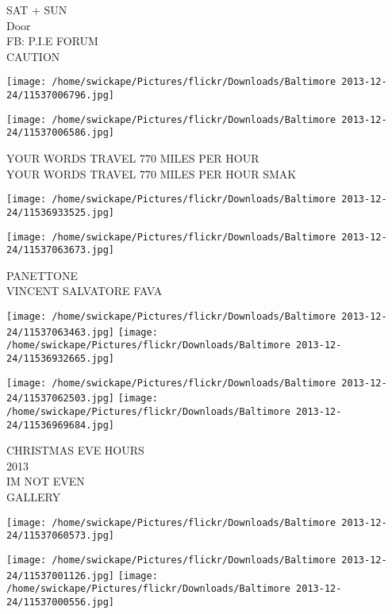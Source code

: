 \documentclass[10pt,letterpaper]{article}
\begin{document}
SAT + SUN\\
Door\\
FB: P.I.E FORUM\\
CAUTION\\
\pagebreak

\texttt{[image: /home/swickape/Pictures/flickr/Downloads/Baltimore 2013-12-24/11537006796.jpg]}

\vspace{0.25in}
\texttt{[image: /home/swickape/Pictures/flickr/Downloads/Baltimore 2013-12-24/11537006586.jpg]}

YOUR WORDS TRAVEL 770 MILES PER HOUR\\
YOUR WORDS TRAVEL 770 MILES PER HOUR SMAK\\
\pagebreak

\texttt{[image: /home/swickape/Pictures/flickr/Downloads/Baltimore 2013-12-24/11536933525.jpg]}

\vspace{0.25in}
\texttt{[image: /home/swickape/Pictures/flickr/Downloads/Baltimore 2013-12-24/11537063673.jpg]}

PANETTONE\\
VINCENT SALVATORE FAVA\\
\pagebreak

\texttt{[image: /home/swickape/Pictures/flickr/Downloads/Baltimore 2013-12-24/11537063463.jpg]}
\texttt{[image: /home/swickape/Pictures/flickr/Downloads/Baltimore 2013-12-24/11536932665.jpg]}

\texttt{[image: /home/swickape/Pictures/flickr/Downloads/Baltimore 2013-12-24/11537062503.jpg]}
\texttt{[image: /home/swickape/Pictures/flickr/Downloads/Baltimore 2013-12-24/11536969684.jpg]}

CHRISTMAS EVE HOURS\\
2013\\
IM NOT EVEN\\
GALLERY\\
\pagebreak

\texttt{[image: /home/swickape/Pictures/flickr/Downloads/Baltimore 2013-12-24/11537060573.jpg]}

\vspace{0.25in}
\texttt{[image: /home/swickape/Pictures/flickr/Downloads/Baltimore 2013-12-24/11537001126.jpg]}
\texttt{[image: /home/swickape/Pictures/flickr/Downloads/Baltimore 2013-12-24/11537000556.jpg]}
\end{document}
